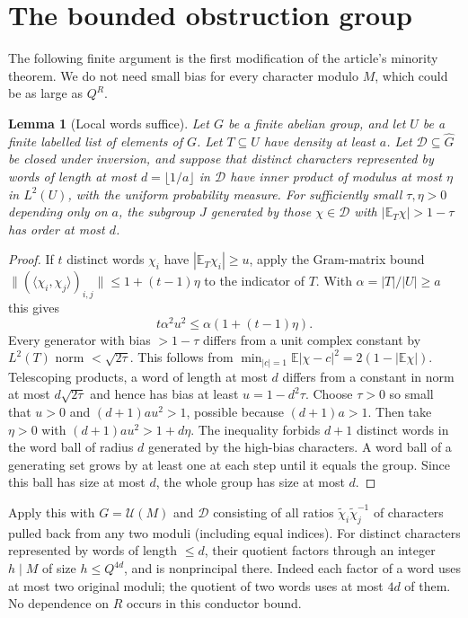 \documentclass[11pt]{article}
\newtheorem{lemma}[theorem]{Lemma}
\theoremstyle{remark}\newtheorem{remark}[theorem]{Remark}
\newcommand{\U}{\mathcal U}
\newcommand{\E}{\mathbb E}
\newcommand{\abs}[1]{\left|#1\right|}
\begin{document}
\section{The bounded obstruction group}
The following finite argument is the first modification of the article's minority theorem. We do not need small bias for every character modulo $M$, which could be as large as $Q^R$.
\begin{lemma}[Local words suffice]\label{lem:words}
Let $G$ be a finite abelian group, and let $U$ be a finite labelled list of elements of $G$. Let $T\subseteq U$ have density at least $a$. Let $\mathcal D\subseteq\widehat G$ be closed under inversion, and suppose that distinct characters represented by words of length at most $d=\lfloor1/a\rfloor$ in $\mathcal D$ have inner product of modulus at most $\eta$ in $L^2(U)$, with the uniform probability measure. For sufficiently small $\tau,\eta>0$ depending only on $a$, the subgroup $J$ generated by those $\chi\in\mathcal D$ with $\abs{\E_T\chi}>1-\tau$ has order at most $d$.
\end{lemma}
\begin{proof}
If $t$ distinct words $\chi_i$ have $\abs{\E_T\chi_i}\ge u$, apply the Gram-matrix bound $\| (\langle\chi_i,\chi_j\rangle)_ {i,j}\|\le1+(t-1)\eta$ to the indicator of $T$. With $\alpha=\abs T/\abs U\ge a$ this gives
\[
 t\alpha^2u^2\le\alpha(1+(t-1)\eta).
\]
Every generator with bias $>1-\tau$ differs from a unit complex constant by $L^2(T)$ norm $<\sqrt{2\tau}$. This follows from $\min_{|c|=1}\E|\chi-c|^2=2(1-|\E\chi|)$. Telescoping products, a word of length at most $d$ differs from a constant in norm at most $d\sqrt{2\tau}$ and hence has bias at least $u=1-d^2\tau$. Choose $\tau>0$ so small that $u>0$ and $(d+1)au^2>1$, possible because $(d+1)a>1$. Then take $\eta>0$ with $(d+1)au^2>1+d\eta$. The inequality forbids $d+1$ distinct words in the word ball of radius $d$ generated by the high-bias characters. A word ball of a generating set grows by at least one at each step until it equals the group. Since this ball has size at most $d$, the whole group has size at most $d$.
\end{proof}

Apply this with $G=\U(M)$ and $\mathcal D$ consisting of all ratios $\widetilde\chi_i\widetilde\chi_j^{-1}$ of characters pulled back from any two moduli (including equal indices). For distinct characters represented by words of length $\le d$, their quotient factors through an integer $h\mid M$ of size $h\le Q^{4d}$, and is nonprincipal there. Indeed each factor of a word uses at most two original moduli; the quotient of two words uses at most $4d$ of them. No dependence on $R$ occurs in this conductor bound.
\end{document}
